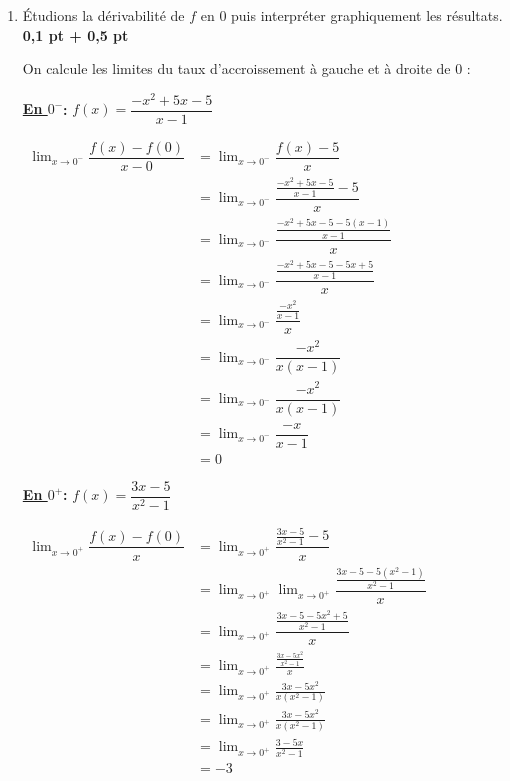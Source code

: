 \documentclass[12pt,a4paper]{article}
\begin{document}
\begin{enumerate}
    
    \item Étudions la dérivabilité de \( f \) en \( 0 \) puis interpréter graphiquement les résultats. \hfill \textbf{0{,}1 pt + 0{,}5 pt}

On calcule les limites du taux d'accroissement à gauche et à droite de 0 :

\textbf{\underline{En $0^{-}$}:}  \( f(x) = \dfrac{-x^2 + 5x - 5}{x - 1} \)

\(
\begin{aligned}
\lim_{x \to 0^-}\dfrac{f(x) - f(0)}{x - 0} &= \lim_{x \to 0^-}\dfrac{f(x) - 5}{x}\\
																					  &= \lim_{x \to 0^-}\dfrac{\frac{-x^2 + 5x - 5}{x - 1} - 5}{x} \\
																						&= \lim_{x \to 0^-}\dfrac{\frac{-x^2 + 5x - 5 - 5(x - 1)}{x - 1}}{x} \\
																						&= \lim_{x \to 0^-}\dfrac{\frac{-x^2 + 5x - 5 - 5x + 5}{x - 1}}{x} \\
																						&= \lim_{x \to 0^-}\dfrac{\frac{-x^2}{x - 1}}{x}\\ 
																						&= \lim_{x \to 0^-}\dfrac{-x^2}{x(x - 1)} \\
																						&= \lim_{x \to 0^-}\dfrac{-x^2}{x(x - 1)} \\
																						&= \lim_{x \to 0^-}\dfrac{-x}{x - 1} \\
																						&= 0
\end{aligned}
\)

\textbf{\underline{En $0^{+}$}:}  \( f(x) = \dfrac{3x - 5}{x^2 - 1} \)

\(
\begin{aligned}
\lim_{x \to 0^+}\dfrac{f(x) - f(0)}{x} &= \lim_{x \to 0^+}\dfrac{\frac{3x - 5}{x^2 - 1} - 5}{x} \\
																			 &= \lim_{x \to 0^+}\lim_{x \to 0^+}\dfrac{\frac{3x - 5 - 5(x^2 - 1)}{x^2 - 1}}{x} \\
																			 &= \lim_{x \to 0^+}\dfrac{\frac{3x - 5 - 5x^2 + 5}{x^2 - 1}}{x}\\ 
																			 &= \lim_{x \to 0^+}\frac{\frac{3x - 5x^2}{x^2 - 1}}{x} \\
                                       &= \lim_{x \to 0^+}\frac{3x - 5x^2}{x(x^2 - 1)} \\
																			 &= \lim_{x \to 0^+} \frac{3x - 5x^2}{x(x^2 - 1)}\\ 
																			 &= \lim_{x \to 0^+} \frac{3 - 5x}{x^2 - 1}\\
																			 &= -3
\end{aligned}
\)


\end{enumerate}
\end{document}
